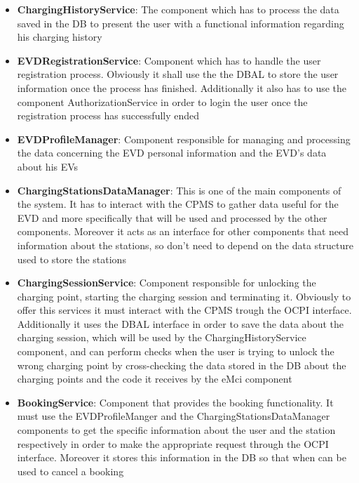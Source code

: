 \begin{itemize}
    \item \textbf{ChargingHistoryService}: The component which has to process the data saved in the DB to present the user with a functional information regarding his charging history

    \item \textbf{EVDRegistrationService}: Component which has to handle the user registration process. Obviously it shall use the the DBAL to store the user information once the process has finished. Additionally it also has to use the component AuthorizationService in order to login the user once the registration process has successfully ended

    \item \textbf{EVDProfileManager}: Component responsible for managing and processing the data concerning the EVD personal information and the EVD's data about his EVs

    \item \textbf{ChargingStationsDataManager}: This is one of the main components of the system. It has to interact with the CPMS to gather data useful for the EVD and more specifically that will be used and processed by the other components. Moreover it acts as an interface for other components that need information about the stations, so don't need to depend on the data structure used to store the stations

    \item \textbf{ChargingSessionService}: Component responsible for unlocking the charging point, starting the charging session and terminating it. Obviously to offer this services it must interact with the CPMS trough the OCPI interface. Additionally it uses the DBAL interface in order to save the data about the charging session, which will be used by the ChargingHistoryService component, and can perform checks when the user is trying to unlock the wrong charging point by cross-checking the data stored in the DB about the charging points and the code it receives by the eMci component

    \item \textbf{BookingService}: Component that provides the booking functionality. It must use the EVDProfileManger and the ChargingStationsDataManager components to get the specific information about the user and the station respectively in order to make the appropriate request through the OCPI interface. Moreover it stores this information in the DB so that when can be used to cancel a booking
    

\end{itemize}
